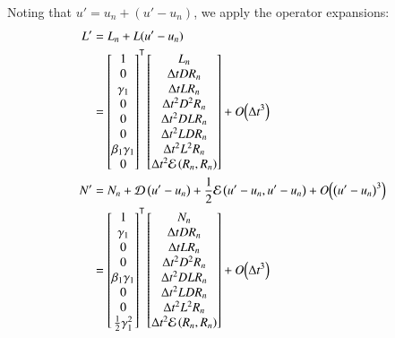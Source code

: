 \documentclass[letterpaper,11pt]{amsart}
\newcommand{\trans}[1]{{#1}^{\ensuremath{\mathsf{T}}}}
\newcommand{\order}[2]{\ensuremath{O\!\left( {#1}^{#2} \right)}}
\begin{document}
Noting that $u' = u_{n} + \left( u' - u_{n} \right)$,
we apply the operator expansions:
\begin{subequations}
\begin{align}
  L'
  &=
  L_{n}
  +
  L(u'-u_{n})
\\
&=
\trans{\begin{bmatrix}
  1 \\
  0 \\
  \gamma_{1} \\
  0 \\
  0 \\
  0 \\
  \beta_{1} \gamma_{1} \\
  0
\end{bmatrix}}
\begin{bmatrix}
  L_{n} \\
  \Delta{}t D R_{n} \\
  \Delta{}t L R_{n} \\
  \Delta{}t^{2} D^{2} R_{n} \\
  \Delta{}t^{2} D L R_{n} \\
  \Delta{}t^{2} L D R_{n} \\
  \Delta{}t^{2} L^{2} R_{n} \\
  \Delta{}t^{2} \mathcal{E}\left( R_{n}, R_{n} \right)
\end{bmatrix}
  + \order{\Delta{}t}{3}
\notag
\\
  N'
  &=
  N_{n}
  + \mathcal{D}\left( u'-u_{n} \right)
  + \frac{1}{2} \mathcal{E}\left( u'-u_{n}, u'-u_{n} \right)
  + \order{\left(u'-u_{n}\right)}{3}
\\
  &=
\trans{\begin{bmatrix}
  1 \\
  \gamma_{1} \\
  0 \\
  0 \\
  \beta_{1} \gamma_{1} \\
  0 \\
  0 \\
  \frac{1}{2} \gamma_{1}^{2}
\end{bmatrix}}
\begin{bmatrix}
  N_{n} \\
  \Delta{}t D R_{n} \\
  \Delta{}t L R_{n} \\
  \Delta{}t^{2} D^{2} R_{n} \\
  \Delta{}t^{2} D L R_{n} \\
  \Delta{}t^{2} L D R_{n} \\
  \Delta{}t^{2} L^{2} R_{n} \\
  \Delta{}t^{2} \mathcal{E}\left( R_{n}, R_{n} \right)
\end{bmatrix}
  + \order{\Delta{}t}{3}
  \notag
\end{align}
\end{subequations}
\end{document}
